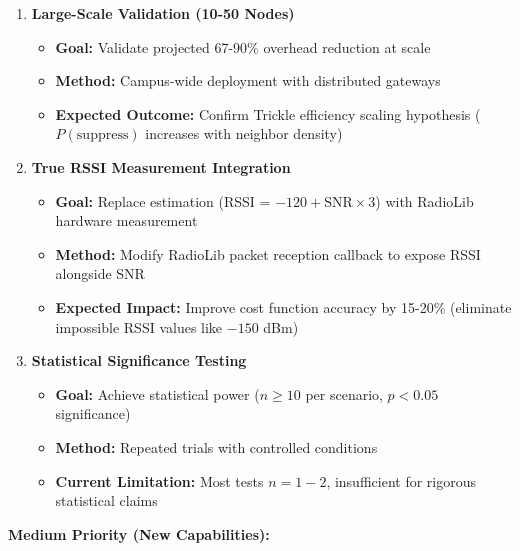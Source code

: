 \begin{enumerate}
\item \textbf{Large-Scale Validation (10-50 Nodes)}
   \begin{itemize}
   \item \textbf{Goal:} Validate projected 67-90\% overhead reduction at scale
   \item \textbf{Method:} Campus-wide deployment with distributed gateways
   \item \textbf{Expected Outcome:} Confirm Trickle efficiency scaling hypothesis ($P(\text{suppress})$ increases with neighbor density)
   \end{itemize}

\item \textbf{True RSSI Measurement Integration}
   \begin{itemize}
   \item \textbf{Goal:} Replace estimation (RSSI = $-120 + \text{SNR} \times 3$) with RadioLib hardware measurement
   \item \textbf{Method:} Modify RadioLib packet reception callback to expose RSSI alongside SNR
   \item \textbf{Expected Impact:} Improve cost function accuracy by 15-20\% (eliminate impossible RSSI values like $-150$ dBm)
   \end{itemize}

\item \textbf{Statistical Significance Testing}
   \begin{itemize}
   \item \textbf{Goal:} Achieve statistical power ($n \geq 10$ per scenario, $p < 0.05$ significance)
   \item \textbf{Method:} Repeated trials with controlled conditions
   \item \textbf{Current Limitation:} Most tests $n=1-2$, insufficient for rigorous statistical claims
   \end{itemize}
\end{enumerate}

\textbf{Medium Priority (New Capabilities):}

